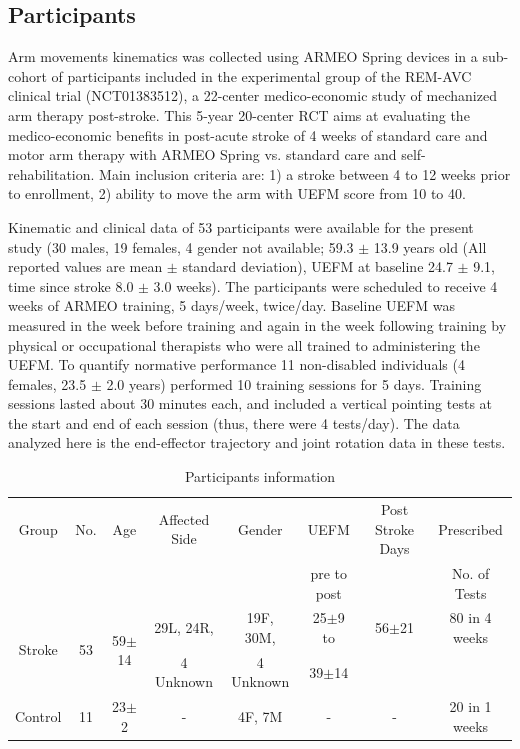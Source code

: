 \subsection{Participants}

Arm movements kinematics was collected using ARMEO Spring devices in a sub-cohort of participants included in the experimental group of the REM-AVC clinical trial (NCT01383512), a 22-center medico-economic study of mechanized arm therapy post-stroke. 
This 5-year 20-center RCT aims at evaluating the medico-economic benefits in post-acute stroke of 4 weeks of standard care and motor arm therapy with ARMEO Spring vs. standard care and self-rehabilitation. 
Main inclusion criteria are: 1) a stroke between 4 to 12 weeks prior to enrollment, 2) ability to move the arm with UEFM score from 10 to 40. 

Kinematic and clinical data of 53 participants were available for the present study (30 males, 19 females, 4 gender not available; 59.3 $\pm$ 13.9 years old (All reported values are mean $\pm$ standard deviation), UEFM at baseline 24.7 $\pm$ 9.1, time since stroke 8.0 $\pm$ 3.0 weeks). 
The participants were scheduled to receive 4 weeks of ARMEO training, 5 days/week, twice/day. 
Baseline UEFM was measured in the week before training and again in the week following training by physical or occupational therapists who were all trained to administering the UEFM. 
To quantify normative performance 11 non-disabled individuals (4 females, 23.5 $\pm$ 2.0 years) performed 10 training sessions for 5 days. 
Training sessions lasted about 30 minutes each, and included a vertical pointing tests at the start and end of each session (thus, there were 4 tests/day). 
The data analyzed here is the end-effector trajectory and joint rotation data in these tests.

\begin{table}[b]
\footnotesize
	\begin{tabular}{|c|c|c|c|c|c|c|c|}
		\hline
		Group & No. & Age & Affected Side & Gender & UEFM & Post Stroke Days & Prescribed \\
		&&&&&  pre to post & & No. of Tests		\\
		\hline
		\multirow{2}{*}{Stroke} & \multirow{2}{*}{53} & \multirow{2}{*}{59$\pm$14} & 29L, 24R, & 19F, 30M, & 25$\pm$9 to & 56$\pm$21 & 80 in 4 weeks \\ 
		&&& 4 Unknown & 4 Unknown & 39$\pm$14 && \\
		\hline
		Control & 11 & 23$\pm$2 & - & 4F, 7M & - & - & 20 in 1 weeks \\
		\hline
	\end{tabular}
	\caption{Participants information}
	\label{tab:demog}
\end{table}

